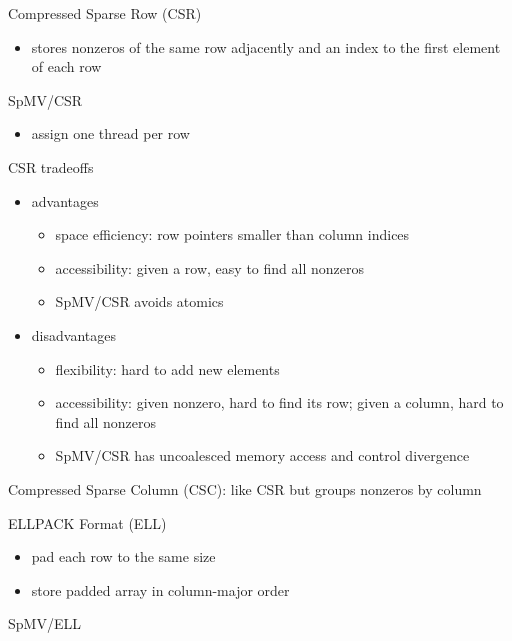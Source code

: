 \documentclass{article}
\begin{document}
Compressed Sparse Row (CSR)
\begin{itemize}
\item stores nonzeros of the same row adjacently and an index to the first element of each row
\end{itemize}
SpMV/CSR
\begin{itemize}
\item assign one thread per row
\end{itemize}
CSR tradeoffs
\begin{itemize}
\item advantages
\begin{itemize}
\item space efficiency: row pointers smaller than column indices
\item accessibility: given a row, easy to find all nonzeros
\item SpMV/CSR avoids atomics
\end{itemize}
\item disadvantages
\begin{itemize}
\item flexibility: hard to add new elements
\item accessibility: given nonzero, hard to find its row; given a column, hard to find all nonzeros
\item SpMV/CSR has uncoalesced memory access and control divergence

\end{itemize}
\end{itemize}

Compressed Sparse Column (CSC): like CSR but groups nonzeros by column



\noindent ELLPACK Format (ELL)

\begin{itemize}
\item pad each row to the same size
\item store padded array in column-major order

\end{itemize}
SpMV/ELL
\end{document}
